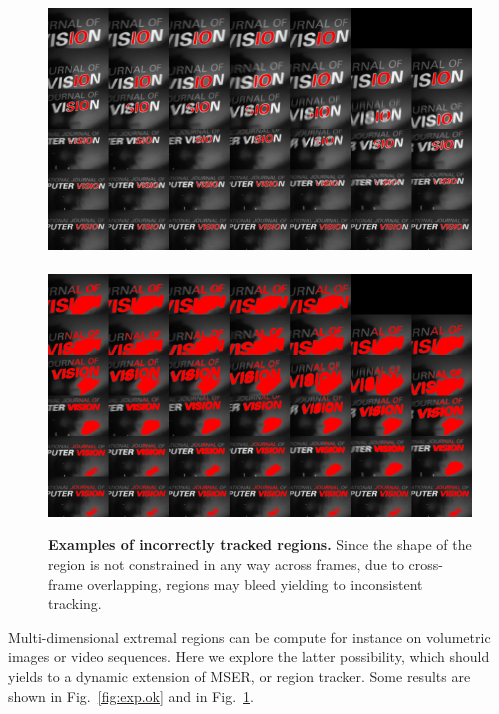 \documentclass{article}
\begin{document}
\begin{figure}
\begin{center}
\includegraphics[width=.48\textwidth]{figures/region-171.png}\ %
\includegraphics[width=.48\textwidth]{figures/region-612.png}\\
\end{center}
\caption{{\bf Examples of incorrectly tracked regions.} Since the shape of the region is not constrained in any way across frames, due to cross-frame overlapping, regions may bleed yielding to inconsistent tracking.}
\label{fig:exp.bleed}
\end{figure}

Multi-dimensional extremal regions can be compute for instance on volumetric images or video sequences. Here we explore the latter possibility, which should yields to a dynamic extension of MSER, or region tracker. Some results are
shown in Fig.~\ref{fig:exp.ok} and in Fig.~\ref{fig:exp.bleed}.



%
\end{document}
